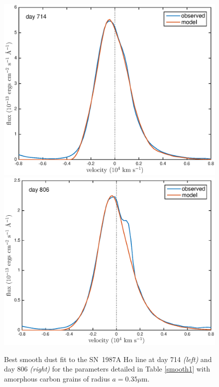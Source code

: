\documentclass[useAMS,usenatbib,usegraphicx]{mnras}
\begin{document}
\begin{figure}
\begin{center}
\includegraphics[trim =33 10 45 15,clip=true,scale=0.47]{smooth/best_fit/d714Ha}
\includegraphics[trim =33 10 45 15,clip=true,scale=0.47]{smooth/best_fit/d806Ha_new}
\caption{Best smooth dust fit to the SN~1987A H$\alpha$ line at day 714 \textit{\textit{(left)}} and day 806 \textit{\textit{(right)}} for the parameters detailed in Table \ref{smooth1} with amorphous carbon grains of radius $a=0.35 \mu$m.}
\label{Ha_smooth}
\end{center}
\end{figure}
\end{document}
